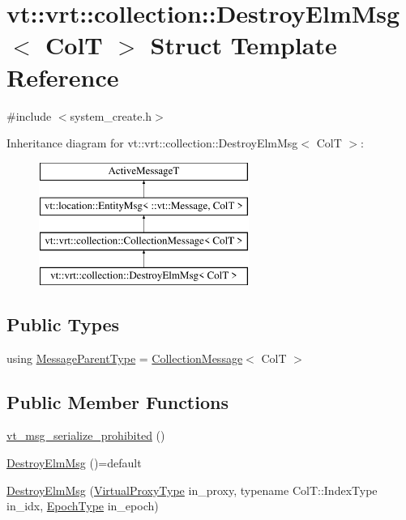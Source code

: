 \hypertarget{structvt_1_1vrt_1_1collection_1_1_destroy_elm_msg}{}\section{vt\+:\+:vrt\+:\+:collection\+:\+:Destroy\+Elm\+Msg$<$ ColT $>$ Struct Template Reference}
\label{structvt_1_1vrt_1_1collection_1_1_destroy_elm_msg}


{\ttfamily \#include $<$system\+\_\+create.\+h$>$}

Inheritance diagram for vt\+:\+:vrt\+:\+:collection\+:\+:Destroy\+Elm\+Msg$<$ ColT $>$\+:\begin{figure}[H]
\begin{center}
\leavevmode
\includegraphics[height=4.000000cm]{structvt_1_1vrt_1_1collection_1_1_destroy_elm_msg}
\end{center}
\end{figure}
\subsection*{Public Types}
\begin{DoxyCompactItemize}
\item 
using \hyperlink{structvt_1_1vrt_1_1collection_1_1_destroy_elm_msg_a4e24b2bce083d36d6fb448e37f40833b}{Message\+Parent\+Type} = \hyperlink{structvt_1_1vrt_1_1collection_1_1_collection_message}{Collection\+Message}$<$ ColT $>$
\end{DoxyCompactItemize}
\subsection*{Public Member Functions}
\begin{DoxyCompactItemize}
\item 
\hyperlink{structvt_1_1vrt_1_1collection_1_1_destroy_elm_msg_ae016922c6fe3c19d38d6e164e8660f65}{vt\+\_\+msg\+\_\+serialize\+\_\+prohibited} ()
\item 
\hyperlink{structvt_1_1vrt_1_1collection_1_1_destroy_elm_msg_a2bf33cf7e0b6327724ecab2ac97774b4}{Destroy\+Elm\+Msg} ()=default
\item 
\hyperlink{structvt_1_1vrt_1_1collection_1_1_destroy_elm_msg_a837873a189d4267f599ec975d2cde6f2}{Destroy\+Elm\+Msg} (\hyperlink{namespacevt_a1b417dd5d684f045bb58a0ede70045ac}{Virtual\+Proxy\+Type} in\+\_\+proxy, typename Col\+T\+::\+Index\+Type in\+\_\+idx, \hyperlink{namespacevt_a81d11b28122d43bf9834577e4a06440f}{Epoch\+Type} in\+\_\+epoch)
\end{DoxyCompactItemize}
